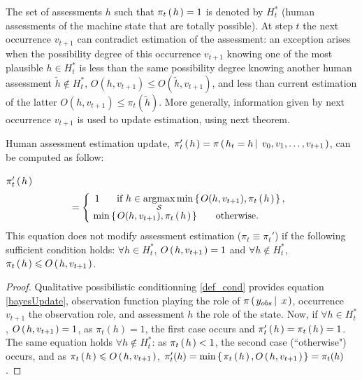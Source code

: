 The set of  assessments $h$ such that $\pi_{t} \left( \left.  h  \right. \right) = 1$ 
is denoted by $H_t^*$
(human assessments of the machine state that are totally possible). 
At step $t$ the next occurrence $v_{t+1}$ 
can contradict estimation of the assessment: 
an exception arises when the possibility degree of this occurrence $v_{t+1}$ 
knowing one of the most plausible $ h \in H_t^*$ 
is less than the same possibility degree 
knowing another human assessment 
$\tilde{h} \notin H_t^*$, $O (h, v_{t+1}) \leqslant O (\tilde{h}, v_{t+1})$, 
and less than current estimation of the latter 
$O (h, v_{t+1}) \leqslant \pi_t (\tilde{h})$. 
More generally, information given by next occurrence $v_{t+1}$ 
is used to update estimation, using next theorem. 
\begin{theorem} 
\label{thmUpdate}
Human assessment estimation update,
$\pi_{t}' \left( \left. h \right. \right) = \pi \left( \left.  h_t = h \, \right| \left. \, v_0,v_1, \ldots, v_{t+1}  \right. \right)$,
can be computed as follow: 

$\pi_{t}' \left( \left. h \right. \right) $
\begin{equation}
= \left \{ \begin{array}{ccc}
1 \hspace{0.5cm} \mbox{ if }  h \in \displaystyle \operatorname*{argmax}_{\mathcal{S}} \min \set{ O(h,v_{t+1}), \pi_t \paren{ h } }, \\
\hspace{-1cm} \min  \set{ O(h,v_{t+1}), \pi_t \paren{h}} \hspace{0.5cm} \mbox{ otherwise.}  
\end{array} \right .
\label{bayesUpdate}
\end{equation}
This equation does not modify assessment estimation 
($\pi_t \equiv \pi_t'$) 
if the following sufficient condition holds: 
$\forall h \in H_t^*$, $O \left( \left.  h, v_{t+1}  \right. \right) = 1$ 
and $\forall h \notin H_t^*$, $\pi_t \left( \left.  h  \right. \right) \leqslant O \left( \left.  h, v_{t+1} \right. \right)$.
\end{theorem}
\begin{proof}
Qualitative possibilistic conditionning \ref{def_cond} 
provides equation \ref{bayesUpdate}, observation function
playing the role of $\pi \left( \left.  y_{obs} \, \right| \left. \, x  \right. \right)$,
occurrence $v_{t+1}$ the observation role, and 
assessment $h$ the role of the state.
Now, if $\forall h \in H_t^*$, $O \left( \left.  h, v_{t+1} \right. \right) = 1$, 
as $\pi_t(h)=1$, the first case occurs
and $\pi_t' \left( \left. h \right. \right) = \pi_t \left( \left. h \right. \right) = 1$. 
The same equation holds $\forall h \notin H_t^*$: 
as $\pi_t \left( \left.  h  \right. \right) < 1$, 
the second case (``otherwise") occurs, 
and as $\pi_t \left( \left.  h  \right. \right) \leqslant O \left( \left.  h, v_{t+1} \right. \right) $,
$\pi_t' (h) = \min \left\{ \left.  \pi_t \left( \left.  h  \right. \right) , O \left( \left.  h, v_{t+1} \right. \right) \right. \right\} = \pi_t (h)$.
\end{proof}

